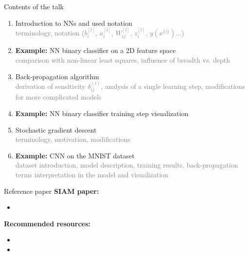\frame{\titlepage}

\begin{frame}{Contents of the talk}
    \begin{enumerate}
        \item Introduction to \acp{NN} and used notation\\
            \textcolor{gray}{
                \scriptsize{
                    terminology, notation
                    (\(b^{[l]}_i,\,a^{[l]}_i,\,W^{[l]}_{ij},\,z^{[l]}_i,\,y(x^{\{i\}})\ldots\)) }
        }
        \item \textbf{Example:} \ac{NN} binary classifier on a 2D feature space \\
            \textcolor{gray}{
                \scriptsize{comparison with non-linear least squares, influence of breadth vs. depth}
            }
        \item Back-propagation algorithm \\
            \textcolor{gray}{
                \scriptsize{
                    derivation of sensitivity \(\delta^{(l)}_{ij}\), analysis of a single learning step,
                modifications for more complicated models
                }
            }
        \item \textbf{Example:} \ac{NN} binary classifier training step visualization
        \item Stochastic gradient descent \\
            \textcolor{gray}{
                \scriptsize{terminology, motivation, modifications}
            }
        \item \textbf{Example:} \acs{CNN} on the \acs{MNIST} dataset \\
            \textcolor{gray}{
                \scriptsize{
                    dataset introduction, model description, training results, back-propagation terms interpretation in
                    the model and visualization
                }
            }
 \end{enumerate} 
\end{frame}

\begin{frame}{Reference paper}
    \textbf{SIAM paper:} \\
    \begin{itemize}
       \item\scriptsize{}
    \end{itemize}
    \textbf{Recommended resources:} \\
    \begin{itemize}
        \item \scriptsize{}
        \item \scriptsize{}
    \end{itemize}

\end{frame}

